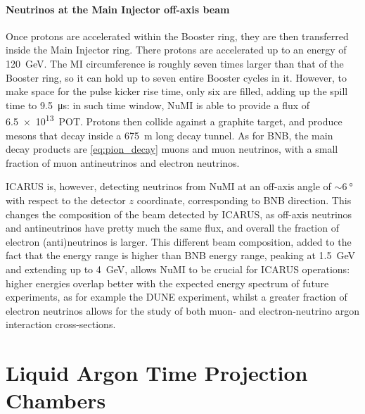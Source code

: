 \paragraph{Neutrinos at the Main Injector off-axis beam} Once protons are accelerated within the Booster ring, they are then transferred inside the Main Injector ring. There protons are accelerated up to an energy of \SI{120}{GeV}. The MI circumference is roughly seven times larger than that of the Booster ring, so it can hold up to seven entire Booster cycles in it. However, to make space for the pulse kicker rise time, only six are filled, adding up the spill time to \SI{9.5}{\micro\second}: in such time window, NuMI is able to provide a flux of \SI{6.5e13}{POT}. Protons then collide against a graphite target, and produce mesons that decay inside a \SI{675}{\meter} long decay tunnel. As for BNB, the main decay products are \eqref{eq:pion_decay} muons and muon neutrinos, with a small fraction of muon antineutrinos and electron neutrinos. 

ICARUS is, however, detecting neutrinos from NuMI at an off-axis angle of ${\sim}\SI{6}{\degree}$ with respect to the detector $z$ coordinate, corresponding to BNB direction. This changes the composition of the beam detected by ICARUS, as off-axis neutrinos and antineutrinos have pretty much the same flux, and overall the fraction of electron (anti)neutrinos is larger. This different beam composition, added to the fact that the energy range is higher than BNB energy range, peaking at \SI{1.5}{GeV} and extending up to \SI{4}{GeV}, allows NuMI to be crucial for ICARUS operations: higher energies overlap better with the expected energy spectrum of future experiments, as for example the DUNE experiment, whilst a greater fraction of electron neutrinos allows for the study of both muon- and electron-neutrino argon interaction cross-sections. 

\section{Liquid Argon Time Projection Chambers} 

